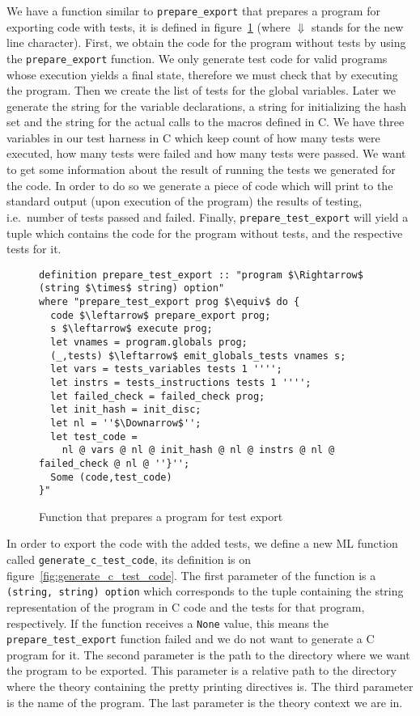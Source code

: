 We have a function similar to \verb|prepare_export| that prepares a program for exporting code with tests, it is defined in figure~\ref{fig:prepare_test_export} (where $\Downarrow$ stands for the new line character).
First, we obtain the code for the program without tests by using the \verb|prepare_export| function.
We only generate test code for valid programs whose execution yields a final state, therefore we must check that by executing the program.
Then we create the list of tests for the global variables.
Later we generate the string for the variable declarations, a string for initializing the hash set and the string for the actual calls to the macros defined in C.
We have three variables in our test harness in C which keep count of how many tests were executed, how many tests were failed and how many tests were passed.
We want to get some information about the result of running the tests we generated for the code.
In order to do so we generate a piece of code which will print to the standard output (upon execution of the program) the results of testing, i.e.\ number of tests passed and failed.
Finally, \verb|prepare_test_export| will yield a tuple which contains the code for the program without tests, and the respective tests for it.

\begin{figure}
\begin{lstlisting}[mathescape=true]
definition prepare_test_export :: "program $\Rightarrow$ (string $\times$ string) option"
where "prepare_test_export prog $\equiv$ do {
  code $\leftarrow$ prepare_export prog;
  s $\leftarrow$ execute prog;
  let vnames = program.globals prog;
  (_,tests) $\leftarrow$ emit_globals_tests vnames s;
  let vars = tests_variables tests 1 '''';
  let instrs = tests_instructions tests 1 '''';
  let failed_check = failed_check prog;
  let init_hash = init_disc;
  let nl = ''$\Downarrow$'';
  let test_code =
    nl @ vars @ nl @ init_hash @ nl @ instrs @ nl @ failed_check @ nl @ ''}'';
  Some (code,test_code)
}"
\end{lstlisting}

\caption{Function that prepares a program for test export}
\label{fig:prepare_test_export}
\end{figure}


In order to export the code with the added tests, we define a new ML function called \verb|generate_c_test_code|, its definition is on figure~\ref{fig:generate_c_test_code}.
The first parameter of the function is a \verb|(string, string) option| which corresponds to the tuple containing the string representation of the program in C code and the tests for that program, respectively.
If the function receives a \verb|None| value, this means the \verb|prepare_test_export| function failed and we do not want to generate a C program for it.
The second parameter is the path to the directory where we want the program to be exported.
This parameter is a relative path to the directory where the theory containing the pretty printing directives is.
The third parameter is the name of the program.
The last parameter is the theory context we are in.

